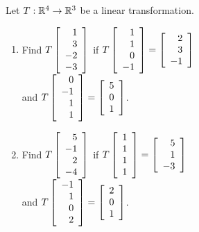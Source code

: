 \begin{multicols}{2}
\columnbreak
\begin{ex}
Let $T : \mathbb{R}^4 \to \mathbb{R}^3$ be a linear transformation.
{\footnotesize
\begin{enumerate}[label={\alph*.}]
\item Find $T \left[ \begin{array}{r}
1 \\
3 \\
-2 \\
-3
\end{array} \right]$
 if $T \left[ \begin{array}{r}
 1 \\
 1 \\
 0 \\
 -1
 \end{array} \right] = \left[ \begin{array}{r}
 2 \\
 3 \\
 -1
 \end{array} \right]$
  \\and $T \left[ \begin{array}{r}
 0 \\
 -1 \\
 1 \\
 1
 \end{array} \right] = \left[ \begin{array}{r}
 5 \\
 0 \\
 1
 \end{array} \right]$.

\item Find $T \left[ \begin{array}{r}
5 \\
-1 \\
2 \\
-4
\end{array} \right]$
if $T \left[ \begin{array}{r}
1 \\
1 \\
1 \\
1
\end{array} \right] = \left[ \begin{array}{r}
5 \\
1 \\
-3
\end{array} \right]$
\\and $T \left[ \begin{array}{r}
-1 \\
1 \\
0 \\
2
\end{array} \right] = \left[ \begin{array}{r}
2 \\
0 \\
1
\end{array} \right]$.


\end{enumerate}}
\end{ex}
\end{multicols}
